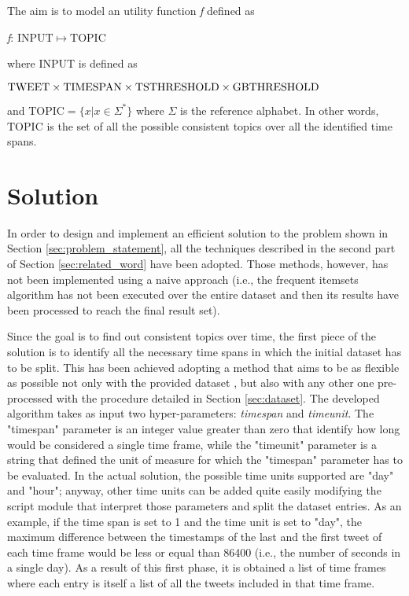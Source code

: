 \noindent The aim is to model an utility function \textit{f} defined as
\begin{center}
	\textit{f}: $\mathrm{INPUT} \mapsto \mathrm{TOPIC}$
\end{center}
where $\mathrm{INPUT}$ is defined as 
\begin{center}
	$\mathrm{TWEET} \times \mathrm{TIMESPAN} \times \mathrm{TS\-THRESHOLD} \times \mathrm{GB\-THRESHOLD}$
\end{center}
 and $\mathrm{TOPIC} = \{x | x \in \Sigma^*\}$ where $\Sigma$ is the reference alphabet. In other words, $\mathrm{TOPIC}$ is the set of all the possible consistent topics over all the identified time spans.

\section{Solution}
\label{sec:solution}
In order to design and implement an efficient solution to the problem shown in Section \ref{sec:problem_statement}, all the techniques described in the second part of Section \ref{sec:related_word} have been adopted. Those methods, however, has not been implemented using a naive approach (i.e., the frequent itemsets algorithm has not been executed over the entire dataset and then its results have been processed to reach the final result set). 

Since the goal is to find out consistent topics over time, the first piece of the solution is to identify all the necessary time spans in which the initial dataset has to be split. This has been achieved adopting a method that aims to be as flexible as possible not only with the provided dataset \cite{covid19-tweets-dataset}, but also with any other one pre-processed with the procedure detailed in Section \ref{sec:dataset}. The developed algorithm takes as input two hyper-parameters: \textit{timespan} and \textit{timeunit}. The "timespan" parameter is an integer value greater than zero that identify how long would be considered a single time frame, while the "timeunit" parameter is a string that defined the unit of measure for which the "timespan" parameter has to be evaluated. In the actual solution, the possible time units supported are "day" and "hour"; anyway, other time units can be added quite easily modifying the script module that interpret those parameters and split the dataset entries. As an example, if the time span is set to 1 and the time unit is set to "day", the maximum difference between the timestamps of the last and the first tweet of each time frame would be less or equal than 86400 (i.e., the number of seconds in a single day). As a result of this first phase, it is obtained a list of time frames where each entry is itself a list of all the tweets included in that time frame.

